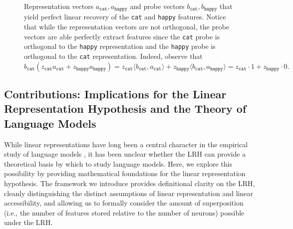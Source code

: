 \documentclass[10pt]{article}
\begin{document}
\begin{ReviewVerbatim}
\begin{figure}
\centering
{}
\caption{Representation vectors $a_{\texttt{cat}}, a_{\texttt{happy}}$ and probe vectors $b_{\texttt{cat}}, b_{\texttt{happy}}$ that yield perfect linear recovery of the \texttt{cat} and \texttt{happy} features. Notice that while the representation vectors are not orthogonal, the probe vectors are able perfectly extract features since the \texttt{cat} probe is orthogonal to the \texttt{happy} representation and the \texttt{happy} probe is orthogonal to the \texttt{cat} representation. Indeed, observe that $b_{\texttt{cat}}(z_{\texttt{cat}}a_{\texttt{cat}} + z_{\texttt{happy}}a_{\texttt{happy}}) = z_{\texttt{cat}}\langle b_{\texttt{cat}}, a_{\texttt{cat}}\rangle + z_{\texttt{happy}}\langle b_{\texttt{cat}}, a_{\texttt{happy}}\rangle = z_{\texttt{cat}}\cdot 1 + z_{\texttt{happy}}\cdot 0.$}
\end{figure}

\subsection{Contributions: Implications for the Linear Representation Hypothesis and the Theory of Language Models}

While linear representations have long been a central character in the empirical study of language models \citep{mikolov2013distributed,alain2016understanding}, it has been unclear whether the LRH can provide a theoretical basis by which to study language models. Here, we explore this possibility by providing mathematical foundations for the linear representation hypothesis. The framework we introduce provides definitional clarity on the LRH, cleanly distinguishing the distinct assumptions of linear representation and linear accessibility, and allowing us to formally consider the amount of superposition (i.e., the number of features stored relative to the number of neurons) possible under the LRH.


\end{ReviewVerbatim}
\end{document}
